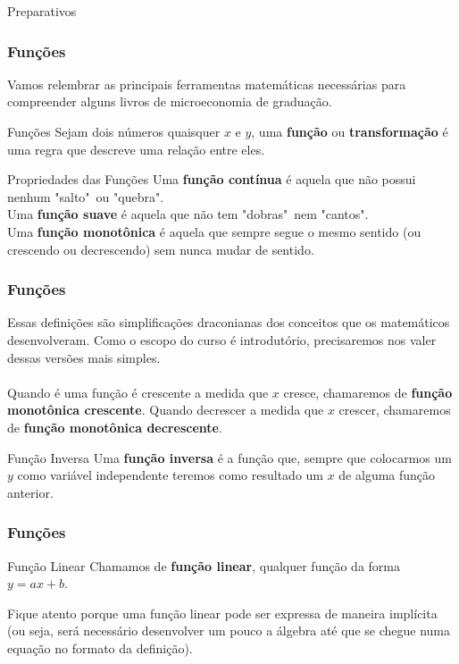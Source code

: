 \documentclass{beamer}[10]
\begin{document}
\begin{frame}
	\Huge Preparativos
\end{frame}

\begin{frame}
	\frametitle{Funções}
	Vamos relembrar as principais ferramentas  matemáticas necessárias para compreender alguns livros de microeconomia de graduação.
	\begin{block}{Funções}
		Sejam dois números quaisquer $x$ e $y$, uma \textbf{função} ou \textbf{transformação} é uma regra que descreve uma relação entre eles.
	\end{block}

	\begin{block}{Propriedades das Funções}
		Uma \textbf{função contínua} é aquela que não possui nenhum "salto"\ ou "quebra".\\
		Uma \textbf{função suave} é aquela que não tem "dobras"\ nem "cantos".\\
		Uma \textbf{função monotônica} é aquela que sempre segue o mesmo sentido (ou crescendo ou decrescendo) sem nunca mudar de sentido.
	\end{block}
\end{frame}

\begin{frame}
	\frametitle{Funções}

	Essas definições são simplificações draconianas dos conceitos que os matemáticos desenvolveram. Como o escopo do curso é introdutório, precisaremos nos valer dessas versões mais simples.
	\\~\\
	Quando é uma função é crescente a medida que $x$ cresce, chamaremos de \textbf{função monotônica crescente}. Quando decrescer a medida que $x$ crescer, chamaremos de \textbf{função monotônica decrescente}.

	\begin{block}{Função Inversa}
		Uma \textbf{função inversa} é a função que, sempre que colocarmos um $y$ como variável independente teremos como resultado um $x$ de alguma função anterior.
	\end{block}
\end{frame}

\begin{frame}
	\frametitle{Funções}

	\begin{block}{Função Linear}
		Chamamos de \textbf{função linear}, qualquer função da forma $y = ax + b$.
	\end{block}
	Fique atento porque uma função linear pode ser expressa de maneira implícita (ou seja, será necessário desenvolver um pouco a álgebra até que se chegue numa equação no formato da definição).
\end{frame}
\end{document}
